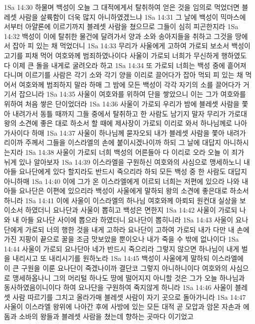 1Sa 14:30  하물며 백성이 오늘 그 대적에게서 탈취하여 얻은 것을 임의로 먹었더면 블레셋 사람을 살륙함이 더욱 많지 아니하였겠느냐
1Sa 14:31  그 날에 백성이 믹마스에서부터 아얄론에 이르기까지 블레셋 사람을 쳤으므로 그들이 심히 피곤한지라
1Sa 14:32  백성이 이에 탈취한 물건에 달려가서 양과 소와 송아지들을 취하고 그것을 땅에서 잡아 피 있는 채 먹었더니
1Sa 14:33  무리가 사울에게 고하여 가로되 보소서 백성이 고기를 피채 먹어 여호와께 범죄하였나이다 사울이 가로되 너희가 무신하게 행하였도다 이제 큰 돌을 내게로 굴려오라 하고
1Sa 14:34  또 가로되 너희는 백성 중에 흩어져 다니며 이르기를 사람은 각기 소와 각기 양을 이리로 끌어다가 잡아 먹되 피 있는 채 먹어서 여호와께 범죄하지 말라 하매 그 밤에 모든 백성이 각각 자기의 소를 끌어다가 거기서 잡으니라
1Sa 14:35  사울이 여호와를 위하여 단을 쌓았으니 이는 그가 여호와를 위하여 처음 쌓은 단이었더라
1Sa 14:36  사울이 가로되 우리가 밤에 블레셋 사람을 쫓아 내려가서 동틀 때까지 그들 중에서 탈취하고 한 사람도 남기지 말자 무리가 가로대 왕의 소견에 좋은 대로 하소서 할 때에 제사장이 가로되 이리로 와서 하나님께로 나아가사이다 하매
1Sa 14:37  사울이 하나님께 묻자오되 내가 블레셋 사람을 쫓아 내려가리이까 주께서 그들을 이스라엘의 손에 붙이시겠나이까 하되 그 날에 대답지 아니하시는지라
1Sa 14:38  사울이 가로되 너희 백성의 어른들아 다 이리로 오라 오늘 이 죄가 뉘게 있나 알아보자
1Sa 14:39  이스라엘을 구원하신 여호와의 사심으로 맹세하노니 내 아들 요나단에게 있다 할지라도 반드시 죽으리라 하되 모든 백성 중 한 사람도 대답지 아니하매
1Sa 14:40  이에 그가 온 이스라엘에게 이르되 너희는 저편에 있으라 나와 내 아들 요나단은 이편에 있으리라 백성이 사울에게 말하되 왕의 소견에 좋은대로 하소서 하니라
1Sa 14:41  이에 사울이 이스라엘의 하나님 여호와께 아뢰되 원컨대 실상을 보이소서 하였더니 요나단과 사울이 뽑히고 백성은 면한지
1Sa 14:42  사울이 가로되 나와 내 아들 요나단 사이에 뽑으라 하였더니 요나단이 뽑히니라
1Sa 14:43  사울이 요나단에게 가로되 너의 행한 것을 내게 고하라 요나단이 고하여 가로되 내가 다만 내 손에 가진 지팡이 끝으로 꿀을 조금 맛보았을 뿐이오나 내가 죽을 수 밖에 없나이다
1Sa 14:44  사울이 가로되 요나단아 네가 반드시 죽으리라 그렇지 않으면 하나님이 내게 벌을 내리시고 또 내리시기를 원하노라
1Sa 14:45  백성이 사울에게 말하되 이스라엘에 이 큰 구원을 이룬 요나단이 죽겠나이까 결단코 그렇지 아니하니이다 여호와의 사심으로 맹세하옵나니 그의 머리털 하나도 땅에 떨어지지 아니할 것은 그가 오늘 하나님과 동사하였음이니이다 하여 요나단을 구원하여 죽지않게 하니라
1Sa 14:46  사울이 블레셋 사람 따르기를 그치고 올라가매 블레셋 사람이 자기 곳으로 돌아가니라
1Sa 14:47  사울이 이스라엘 왕위에 나아간 후에 사방에 있는 모든 대적 곧 모압과 암몬 자손과 에돔과 소바의 왕들과 블레셋 사람을 쳤는데 향하는 곳마다 이기었고
